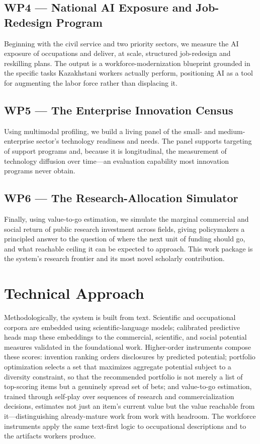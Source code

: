 \documentclass[11pt]{article}
\begin{document}
\subsection*{WP4 --- National AI Exposure and Job-Redesign Program}
Beginning with the civil service and two priority sectors, we measure the AI
exposure of occupations and deliver, at scale, structured job-redesign and
reskilling plans. The output is a workforce-modernization blueprint grounded in
the specific tasks Kazakhstani workers actually perform, positioning AI as a tool
for augmenting the labor force rather than displacing it.

\subsection*{WP5 --- The Enterprise Innovation Census}
Using multimodal profiling, we build a living panel of the small- and
medium-enterprise sector's technology readiness and needs. The panel supports
targeting of support programs and, because it is longitudinal, the measurement of
technology diffusion over time---an evaluation capability most innovation
programs never obtain.

\subsection*{WP6 --- The Research-Allocation Simulator}
Finally, using value-to-go estimation, we simulate the marginal commercial and
social return of public research investment across fields, giving policymakers a
principled answer to the question of where the next unit of funding should go,
and what reachable ceiling it can be expected to approach. This work package is
the system's research frontier and its most novel scholarly contribution.

\section{Technical Approach}

Methodologically, the system is built from text. Scientific and occupational
corpora are embedded using scientific-language models; calibrated predictive
heads map these embeddings to the commercial, scientific, and social potential
measures validated in the foundational work. Higher-order instruments compose
these scores: invention ranking orders disclosures by predicted potential;
portfolio optimization selects a set that maximizes aggregate potential subject
to a diversity constraint, so that the recommended portfolio is not merely a list
of top-scoring items but a genuinely spread set of bets; and value-to-go
estimation, trained through self-play over sequences of research and
commercialization decisions, estimates not just an item's current value but the
value reachable from it---distinguishing already-mature work from work with
headroom. The workforce instruments apply the same text-first logic to
occupational descriptions and to the artifacts workers produce.
\end{document}
